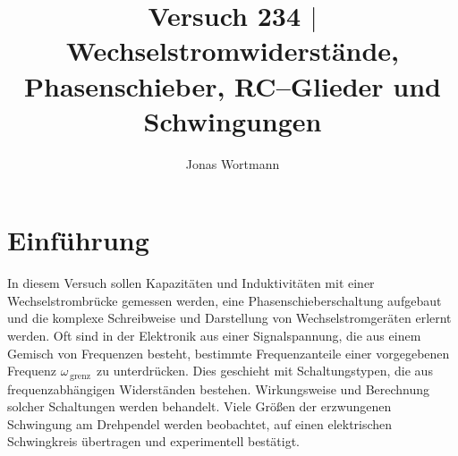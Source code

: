 \documentclass[a4paper,12pt]{article}
\numberwithin{equation}{section}
\begin{document}

\title{Versuch 234 $|$ Wechselstromwiderstände, Phasenschieber, RC--Glieder und Schwingungen}
\author{Jonas Wortmann}
\maketitle
{}


\newpage


\fancyhead[L]{\thepage}
\fancyfoot[C]{}

\tableofcontents


\newpage


\fancyhead[R]{\leftmark\\\rightmark}

\section{Einführung}
In diesem Versuch sollen Kapazitäten und Induktivitäten mit einer Wechselstrombrücke gemessen werden, eine Phasenschieberschaltung aufgebaut und die komplexe Schreibweise und Darstellung von Wechselstromgeräten erlernt werden.
Oft sind in der Elektronik aus einer Signalspannung, die aus einem Gemisch von Frequenzen besteht, bestimmte Frequenzanteile einer vorgegebenen Frequenz $\omega _{\,\text{grenz}\,}$ zu unterdrücken.
Dies geschieht mit Schaltungstypen, die aus frequenzabhängigen Widerständen bestehen.
\indent Wirkungsweise und Berechnung solcher Schaltungen werden behandelt.
Viele Größen der erzwungenen Schwingung am Drehpendel werden beobachtet, auf einen elektrischen Schwingkreis übertragen und experimentell bestätigt.
\end{document}
